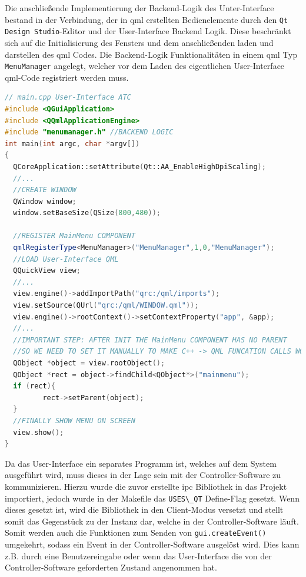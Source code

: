 Die anschließende Implementierung der Backend-Logik des Unter-Interface
bestand in der Verbindung, der in \gls{qml} erstellten Bedienelemente
durch den \passthrough{\lstinline!Qt Design Studio!}-Editor und der
User-Interface Backend Logik. Diese beschränkt sich auf die
Initialisierung des Fensters und dem anschließenden laden und darstellen
des \gls{qml} Codes. Die Backend-Logik Funktionalitäten in einem
\gls{qml} Typ \passthrough{\lstinline!MenuManager!} angelegt, welcher
vor dem Laden des eigentlichen User-Interface \gls{qml}-Code registriert
werden muss.

\begin{lstlisting}[language={C++}]
// main.cpp User-Interface ATC
#include <QGuiApplication>
#include <QQmlApplicationEngine>
#include "menumanager.h" //BACKEND LOGIC
int main(int argc, char *argv[])
{
  QCoreApplication::setAttribute(Qt::AA_EnableHighDpiScaling);
  //...
  //CREATE WINDOW
  QWindow window;
  window.setBaseSize(QSize(800,480));

  //REGISTER MainMenu COMPONENT
  qmlRegisterType<MenuManager>("MenuManager",1,0,"MenuManager");
  //LOAD User-Interface QML
  QQuickView view;
  //...
  view.engine()->addImportPath("qrc:/qml/imports");
  view.setSource(QUrl("qrc:/qml/WINDOW.qml"));
  view.engine()->rootContext()->setContextProperty("app", &app);
  //...
  //IMPORTANT STEP: AFTER INIT THE MainMenu COMPONENT HAS NO PARENT
  //SO WE NEED TO SET IT MANUALLY TO MAKE C++ -> QML FUNCATION CALLS WORKING
  QObject *object = view.rootObject();
  QObject *rect = object->findChild<QObject*>("mainmenu");
  if (rect){
         rect->setParent(object);
  }
  //FINALLY SHOW MENU ON SCREEN
  view.show();
}
\end{lstlisting}

Da das User-Interface ein separates Programm ist, welches auf dem System
ausgeführt wird, muss dieses in der Lage sein mit der
Controller-Software zu kommunizieren. Hierzu wurde die zuvor erstellte
\gls{ipc} Bibliothek in das Projekt importiert, jedoch wurde in der
Makefile das \passthrough{\lstinline!USES\_QT!} Define-Flag gesetzt.
Wenn dieses gesetzt ist, wird die Bibliothek in den Client-Modus
versetzt und stellt somit das Gegenstück zu der Instanz dar, welche in
der Controller-Software läuft. Somit werden auch die Funktionen zum
Senden von \passthrough{\lstinline!gui.createEvent()!} umgekehrt, sodass
ein Event in der Controller-Software ausgelöst wird. Dies kann z.B.
durch eine Benutzereingabe oder wenn das User-Interface die von der
Controller-Software geforderten Zustand angenommen hat.

